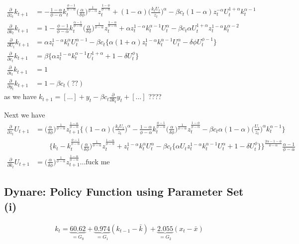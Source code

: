 \documentclass[a4paper]{article}
\theoremstyle{definition}
\begin{document}
	\begin{align*}
	\frac{\partial}{\partial z_t}k_{t+1} 	&= - \frac{1-\alpha}{\phi-\alpha}k_t^{\frac{\phi-1}{\phi-\alpha}}\Big( \frac{\alpha}{\delta\phi} \Big)^{\frac{1}{\phi-\alpha}}z_t^{\frac{1-\phi}{\phi-\alpha}}+(1-\alpha)\Big( \frac{k_t U_t}{z_t} \Big)^{\alpha} - \beta c_t (1-\alpha)z_t^{-\alpha} U_t^{1+\alpha}k_t^{\alpha-1} \\
	\frac{\partial}{\partial k_t}k_{t+1}	&= 1 - \frac{\phi-1}{\phi-\alpha}k_t^{\frac{\alpha-1}{\phi-\alpha}}\Big(\frac{\alpha}{\delta\phi}\Big)^{\frac{1}{\phi-\alpha}}z_t^{\frac{1-\alpha}{\phi-\alpha}} + \alpha z_t^{1-\alpha}k_t^{\alpha-1}U_t^\alpha - \beta c_t \alpha U_t^{1+\alpha} z_t^{1-\alpha}k_t^{\alpha-2} \\
	\frac{\partial}{\partial U_t}k_{t+1}	&= \alpha z_t^{1-\alpha}k_t^{\alpha} U_t^{\alpha-1} - \beta c_t \bigg\{ \alpha(1+\alpha)z_t^{1-\alpha}k_t^{\alpha-1} U_t^{\alpha}- \delta \phi U_t^{\phi-1} \bigg\} \\
	\frac{\partial}{\partial c_t}k_{t+1} 	&= \beta \bigg\{ \alpha z_t^{1-\alpha}k_t^{\alpha-1}U_t^{1+\alpha}+1-\delta U_t^\phi \bigg\} \\
	\frac{\partial}{\partial i_t}k_{t+1}	&= 1\\
	\frac{\partial}{\partial y_t}k_{t+1}	&= 1-\beta c_t (??)
	\end{align*}
as we have $k_{t+1} = [\dots]+y_t - \beta c_t \frac{\partial}{\partial k_t}y_t + [\dots]$	????

Next we have
	\begin{align*}
	\frac{\partial}{\partial z_t}U_{t+1} 	&= \Big( \frac{\alpha}{\delta\phi} \Big)^{\frac{1}{\phi-\alpha}} z_{t+1}^{\frac{1-\alpha}{\phi-\alpha}}\bigg\{ (1-\alpha)\Big( \frac{k_t U_t}{z_t} \Big)^\alpha  - \frac{1-\alpha}{\phi-\alpha}k_t^{\frac{\phi-1}{\phi-\alpha}}\Big( \frac{\alpha}{\delta \phi} \Big)^{\frac{1}{\phi-\alpha}}z_t^{\frac{1-\phi}{\phi-\alpha}} - \beta c_t \alpha(1-\alpha)\Big( \frac{U_t}{z_t} \Big)^\alpha k_t^{\alpha-1} \bigg\} \\
	&\quad\quad  \bigg\{ k_t - k_t^{\frac{\phi-1}{\phi-\alpha}} \Big( \frac{\alpha}{\delta\phi} \Big)^{\frac{1}{\phi-\alpha}} z_t^{\frac{1-\alpha}{\phi-\alpha}} + z_{t}^{1-\alpha} k_{t}^{\alpha} U_{t}^{\alpha} - \beta c_t \bigg\{ \alpha U_{t} z_{t}^{1-\alpha} k_{t}^{\alpha-1} U_{t}^{\alpha}+1-\delta U_{t}^{\phi} \bigg\} \bigg\}^{\frac{2\alpha-1-\phi}{\phi-\alpha}}\frac{\alpha-1}{\phi-\alpha} \\
	\frac{\partial}{\partial k_t}U_{t+1}	&= \Big( \frac{\alpha}{\delta\phi} \Big)^{\frac{1}{\phi-\alpha}} z_{t+1}^{\frac{1-\alpha}{\phi-\alpha}} \dots \text{fuck me}
	\end{align*}












\subsection{Dynare: Policy Function using Parameter Set (i)}
	\begin{align*}
	k_t = \underbrace{60.62}_{=G_0} + \underbrace{0.974}_{=G_1} (k_{t-1}-\bar k) + \underbrace{2.055}_{=G_2} (x_t-\bar x)
	\end{align*}
\end{document}
